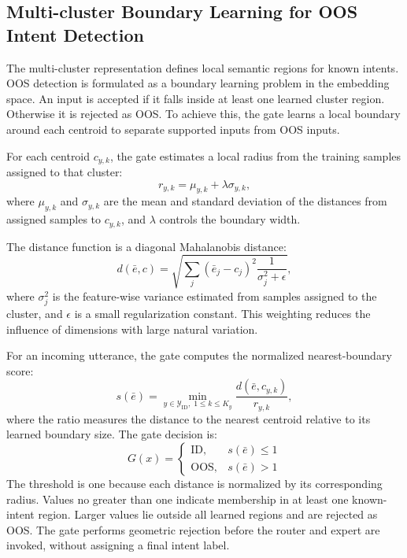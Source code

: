 \subsection{Multi-cluster Boundary Learning for OOS Intent Detection}
The multi-cluster representation defines local semantic regions for known intents. OOS detection is formulated as a boundary learning problem in the embedding space. An input is accepted if it falls inside at least one learned cluster region. Otherwise it is rejected as OOS. To achieve this, the gate learns a local boundary around each centroid to separate supported inputs from OOS inputs.

For each centroid $c_{y,k}$, the gate estimates a local radius from the training samples assigned to that cluster:
\begin{equation}
r_{y,k}=\mu_{y,k} + \lambda \sigma_{y,k},
\end{equation}
where $\mu_{y,k}$ and $\sigma_{y,k}$ are the mean and standard deviation of the distances from assigned samples to $c_{y,k}$, and $\lambda$ controls the boundary width.

The distance function is a diagonal Mahalanobis distance:
\begin{equation}
d(\bar{e},c)=\sqrt{\sum_j(\bar{e}_j-c_j)^2\frac{1}{\sigma_j^2+\epsilon}},
\end{equation}
where $\sigma_j^2$ is the feature-wise variance estimated from samples assigned to the cluster, and $\epsilon$ is a small regularization constant. This weighting reduces the influence of dimensions with large natural variation.

For an incoming utterance, the gate computes the normalized nearest-boundary score:
\begin{equation}
s(\bar{e})=\min_{y \in \mathcal{Y}_{\mathrm{ID}},\; 1 \le k \le K_y}\frac{d(\bar{e},c_{y,k})}{r_{y,k}},
\end{equation}
where the ratio measures the distance to the nearest centroid relative to its learned boundary size. The gate decision is:
\begin{equation}
G(x)=
\begin{cases}
\mathrm{ID}, & s(\bar{e}) \le 1 \\
\mathrm{OOS}, & s(\bar{e}) > 1
\end{cases}
\end{equation}
The threshold is one because each distance is normalized by its corresponding radius. Values no greater than one indicate membership in at least one known-intent region. Larger values lie outside all learned regions and are rejected as OOS. The gate performs geometric rejection before the router and expert are invoked, without assigning a final intent label.
